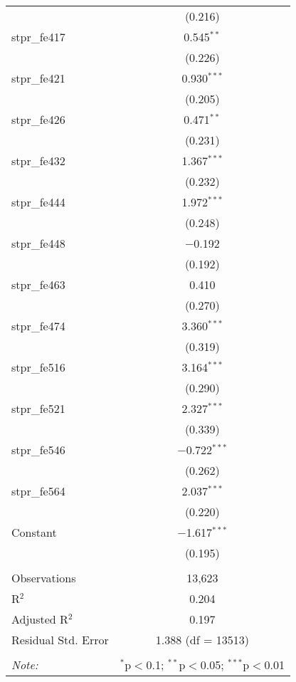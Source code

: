 \begin{table}[!htbp]
\begin{tabular}{@{\extracolsep{5pt}}lc}
  & (0.216) \\ 
  stpr\_fe417 & 0.545$^{**}$ \\ 
  & (0.226) \\ 
  stpr\_fe421 & 0.930$^{***}$ \\ 
  & (0.205) \\ 
  stpr\_fe426 & 0.471$^{**}$ \\ 
  & (0.231) \\ 
  stpr\_fe432 & 1.367$^{***}$ \\ 
  & (0.232) \\ 
  stpr\_fe444 & 1.972$^{***}$ \\ 
  & (0.248) \\ 
  stpr\_fe448 & $-$0.192 \\ 
  & (0.192) \\ 
  stpr\_fe463 & 0.410 \\ 
  & (0.270) \\ 
  stpr\_fe474 & 3.360$^{***}$ \\ 
  & (0.319) \\ 
  stpr\_fe516 & 3.164$^{***}$ \\ 
  & (0.290) \\ 
  stpr\_fe521 & 2.327$^{***}$ \\ 
  & (0.339) \\ 
  stpr\_fe546 & $-$0.722$^{***}$ \\ 
  & (0.262) \\ 
  stpr\_fe564 & 2.037$^{***}$ \\ 
  & (0.220) \\ 
  Constant & $-$1.617$^{***}$ \\ 
  & (0.195) \\ 
 \hline \\[-1.8ex] 
Observations & 13,623 \\ 
R$^{2}$ & 0.204 \\ 
Adjusted R$^{2}$ & 0.197 \\ 
Residual Std. Error & 1.388 (df = 13513) \\ 
\hline 
\hline \\[-1.8ex] 
\textit{Note:}  & \multicolumn{1}{r}{$^{*}$p$<$0.1; $^{**}$p$<$0.05; $^{***}$p$<$0.01} \\ 
\end{tabular} 
\end{table} 
